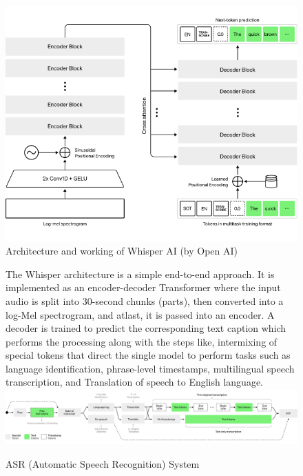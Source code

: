 \documentclass[12px]{beamer}
\begin{document}
\begin{frame}
\begin{figure}
    \includegraphics[width=\textwidth]{whisper1.png}
    \caption{Architecture and working of Whisper AI (by Open AI)}
\end{figure}
\end{frame}

\begin{frame}
\begin{figure}
    The Whisper architecture is a simple end-to-end approach. It is implemented as an encoder-decoder Transformer
where the input audio is split into 30-second chunks (parts), then converted into a log-Mel spectrogram, and atlast,
it is passed into an encoder. A decoder is trained to predict the corresponding text caption which performs the
processing along with the steps like, intermixing of special tokens that direct the single model to perform tasks such
as language identification, phrase-level timestamps, multilingual speech transcription, and Translation of speech to
English language.
    \includegraphics[width=\textwidth]{asr-details.png}
    \caption{ASR (Automatic Speech Recognition) System}
\end{figure}
\end{frame}
\end{document}
